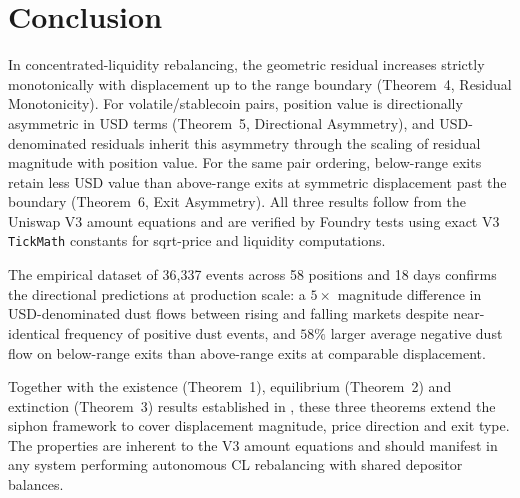 \documentclass[11pt,a4paper]{article}
\theoremstyle{definition}
\begin{document}
\section{Conclusion}

In concentrated-liquidity rebalancing, the geometric residual increases strictly monotonically with displacement up to the range boundary (Theorem~4, Residual Monotonicity). For volatile/stablecoin pairs, position value is directionally asymmetric in USD terms (Theorem~5, Directional Asymmetry), and USD-denominated residuals inherit this asymmetry through the scaling of residual magnitude with position value. For the same pair ordering, below-range exits retain less USD value than above-range exits at symmetric displacement past the boundary (Theorem~6, Exit Asymmetry). All three results follow from the Uniswap V3 amount equations and are verified by Foundry tests using exact V3 \texttt{TickMath} constants for sqrt-price and liquidity computations.

The empirical dataset of 36,337 events across 58 positions and 18 days confirms the directional predictions at production scale: a $5\times$ magnitude difference in USD-denominated dust flows between rising and falling markets despite near-identical frequency of positive dust events, and $58\%$ larger average negative dust flow on below-range exits than above-range exits at comparable displacement.

Together with the existence (Theorem~1), equilibrium (Theorem~2) and extinction (Theorem~3) results established in \citet{ryan2026a}, these three theorems extend the siphon framework to cover displacement magnitude, price direction and exit type. The properties are inherent to the V3 amount equations and should manifest in any system performing autonomous CL rebalancing with shared depositor balances.
\end{document}

